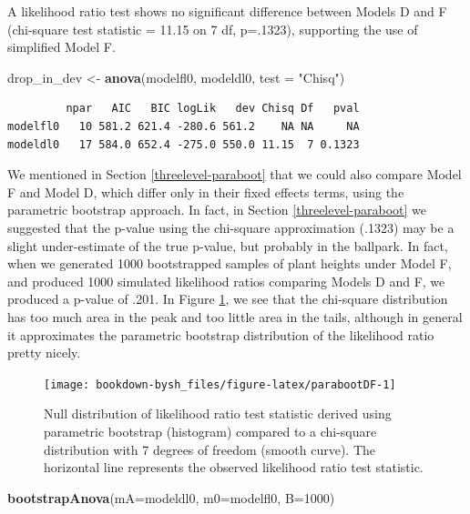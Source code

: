\documentclass[
]{krantz}
\newenvironment{Shaded}{\begin{snugshade}}{\end{snugshade}}
\newcommand{\DataTypeTok}[1]{\textcolor[rgb]{0.27,0.27,0.27}{#1}}
\newcommand{\DecValTok}[1]{\textcolor[rgb]{0.06,0.06,0.06}{#1}}
\newcommand{\KeywordTok}[1]{\textcolor[rgb]{0.27,0.27,0.27}{\textbf{#1}}}
\newcommand{\NormalTok}[1]{#1}
\newcommand{\StringTok}[1]{\textcolor[rgb]{0.5,0.5,0.5}{#1}}
\begin{document}
A likelihood ratio test shows no significant difference between Models D and F (chi-square test statistic = 11.15 on 7 df, p=.1323), supporting the use of simplified Model F.

\begin{Shaded}
\begin{Highlighting}[]
\NormalTok{drop_in_dev <-}\StringTok{ }\KeywordTok{anova}\NormalTok{(modelfl0, modeldl0, }\DataTypeTok{test =} \StringTok{"Chisq"}\NormalTok{)}
\end{Highlighting}
\end{Shaded}

\begin{verbatim}
         npar   AIC   BIC logLik   dev Chisq Df   pval
modelfl0   10 581.2 621.4 -280.6 561.2    NA NA     NA
modeldl0   17 584.0 652.4 -275.0 550.0 11.15  7 0.1323
\end{verbatim}

We mentioned in Section \ref{threelevel-paraboot} that we could also compare Model F and Model D, which differ only in their fixed effects terms, using the parametric bootstrap approach. In fact, in Section \ref{threelevel-paraboot} we suggested that the p-value using the chi-square approximation (.1323) may be a slight under-estimate of the true p-value, but probably in the ballpark. In fact, when we generated 1000 bootstrapped samples of plant heights under Model F, and produced 1000 simulated likelihood ratios comparing Models D and F, we produced a p-value of .201. In Figure \ref{fig:parabootDF}, we see that the chi-square distribution has too much area in the peak and too little area in the tails, although in general it approximates the parametric bootstrap distribution of the likelihood ratio pretty nicely.

\begin{figure}

{\centering \texttt{[image: bookdown-bysh\_files/figure-latex/parabootDF-1]} 

}

\caption{Null distribution of likelihood ratio test statistic derived using parametric bootstrap (histogram) compared to a chi-square distribution with 7 degrees of freedom (smooth curve).  The horizontal line represents the observed likelihood ratio test statistic.}\label{fig:parabootDF}
\end{figure}

\begin{Shaded}
\begin{Highlighting}[]
\KeywordTok{bootstrapAnova}\NormalTok{(}\DataTypeTok{mA=}\NormalTok{modeldl0, }\DataTypeTok{m0=}\NormalTok{modelfl0, }\DataTypeTok{B=}\DecValTok{1000}\NormalTok{)}
\end{Highlighting}
\end{Shaded}
\end{document}
